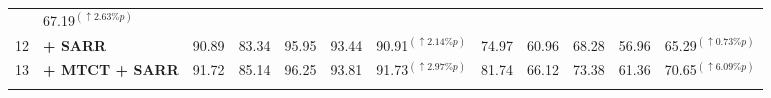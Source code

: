 \begin{table}[t]
\begin{center}
{\begin{tabular}{l|lcccclccccl}
& {\color[HTML]{F56B00} 67.19$^{(\uparrow2.63\%p)}$} \\
12
& {\color[HTML]{F56B00}
\textbf{+ SARR}}
& {\color[HTML]{F56B00} 90.89}
& {\color[HTML]{F56B00} 83.34}
& {\color[HTML]{F56B00} 95.95}
& {\color[HTML]{F56B00} 93.44}
& {\color[HTML]{F56B00} 90.91$^{(\uparrow2.14\%p)}$}
& {\color[HTML]{F56B00} 74.97}
& {\color[HTML]{F56B00} 60.96}
& {\color[HTML]{F56B00} 68.28}
& {\color[HTML]{F56B00} 56.96}
& {\color[HTML]{F56B00} 65.29$^{(\uparrow0.73\%p)}$} \\
13
& {\color[HTML]{009901}
\textbf{+ MTCT + SARR}}
& {\color[HTML]{009901} 91.72}
& {\color[HTML]{009901} 85.14}
& {\color[HTML]{009901} 96.25}
& {\color[HTML]{009901} 93.81}
& {\color[HTML]{009901} 91.73$^{(\uparrow2.97\%p)}$}
& {\color[HTML]{009901} 81.74}
& {\color[HTML]{009901} 66.12}
& {\color[HTML]{009901} 73.38}
& {\color[HTML]{009901} 61.36}
& {\color[HTML]{009901} 70.65$^{(\uparrow6.09\%p)}$} \\
\addlinespace[0.6mm] \hline
\end{tabular}}
\end{center}
\vspace{-5.0mm}
\end{table}


